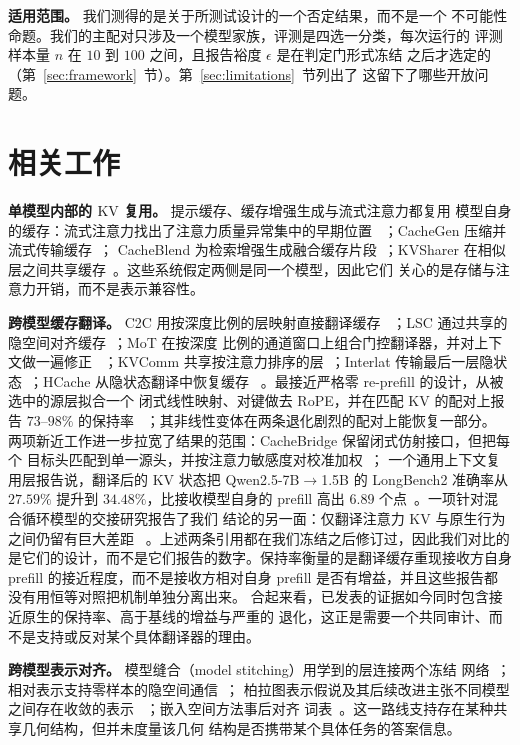 \documentclass[10pt,a4paper,fontset=fandol]{ctexart}
\newcommand{\kv}{\ensuremath{\mathrm{KV}}}
\begin{document}
\textbf{适用范围。} 我们测得的是关于所测试设计的一个否定结果，而不是一个
不可能性命题。我们的主配对只涉及一个模型家族，评测是四选一分类，每次运行的
评测样本量 $n$ 在 $10$ 到 $100$ 之间，且报告裕度 $\epsilon$ 是在判定门形式冻结
之后才选定的（第~\ref{sec:framework}~节）。第~\ref{sec:limitations}~节列出了
这留下了哪些开放问题。

\section{相关工作}
\label{sec:survey}

\textbf{单模型内部的 \kv{} 复用。} 提示缓存、缓存增强生成与流式注意力都复用
模型自身的缓存：流式注意力找出了注意力质量异常集中的早期位置
~\citep{streamingsink2023}；CacheGen 压缩并流式传输缓存~\citep{cachegen2024}；
CacheBlend 为检索增强生成融合缓存片段~\citep{cacheblend2025}；KVSharer 在相似
层之间共享缓存~\citep{kvsharer2024}。这些系统假定两侧是同一个模型，因此它们
关心的是存储与注意力开销，而不是表示兼容性。

\textbf{跨模型缓存翻译。} C2C 用按深度比例的层映射直接翻译缓存
~\citep{c2c2025}；LSC 通过共享的隐空间对齐缓存~\citep{lsc2026}；MoT 在按深度
比例的通道窗口上组合门控翻译器，并对上下文做一遍修正
~\citep{mot2026}；KVComm 共享按注意力排序的层~\citep{kvcomm2025}；Interlat
传输最后一层隐状态~\citep{interlat2025}；HCache 从隐状态翻译中恢复缓存
~\citep{hcache2025}。最接近严格零 re-prefill 的设计，从被选中的源层拟合一个
闭式线性映射、对键做去 RoPE，并在匹配 \kv{} 的配对上报告 $73$--$98\%$ 的保持率
~\citep{heo2026}；其非线性变体在两条退化剧烈的配对上能恢复一部分。
两项新近工作进一步拉宽了结果的范围：CacheBridge 保留闭式仿射接口，但把每个
目标头匹配到单一源头，并按注意力敏感度对校准加权~\citep{cachebridge2026}；
一个通用上下文复用层报告说，翻译后的 \kv{} 状态把 Qwen2.5-7B$\to$1.5B 的
LongBench2 准确率从 $27.59\%$ 提升到 $34.48\%$，比接收模型自身的 prefill 高出
$6.89$ 个点~\citep{contextreuse2026}。一项针对混合循环模型的交接研究报告了我们
结论的另一面：仅翻译注意力 \kv{} 与原生行为之间仍留有巨大差距
~\citep{latentport2026}。上述两条引用都在我们冻结之后修订过，因此我们对比的
是它们的设计，而不是它们报告的数字。保持率衡量的是翻译缓存重现接收方自身
prefill 的接近程度，而不是接收方相对自身 prefill 是否有增益，并且这些报告都
没有用恒等对照把机制单独分离出来。
合起来看，已发表的证据如今同时包含接近原生的保持率、高于基线的增益与严重的
退化，这正是需要一个共同审计、而不是支持或反对某个具体翻译器的理由。

\textbf{跨模型表示对齐。} 模型缝合（model stitching）用学到的层连接两个冻结
网络~\citep{stitching2021}；相对表示支持零样本的隐空间通信~\citep{relrep2022}；
柏拉图表示假说及其后续改进主张不同模型之间存在收敛的表示
~\citep{platonic2024,perfectplatonic2025,aristotelian2026}；嵌入空间方法事后对齐
词表~\citep{vec2vec2025}。这一路线支持存在某种共享几何结构，但并未度量该几何
结构是否携带某个具体任务的答案信息。
\end{document}
